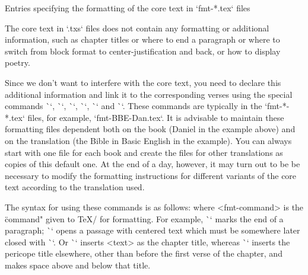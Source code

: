\secc[fmt] Entries specifying the formatting of the core text in `fmt-*.tex` files

The core text in `.txs` files does not contain any formatting or additional information, 
such as chapter titles or where to end a paragraph or where to switch from block format 
to center-justification   and back, or how to display poetry.


Since we don't want to interfere with the core text, 
you need to declare this additional information and link it to the corresponding verses using the special commands \`\fmtadd`, \`\fmtpre`, \`\fmtins`, \`\fmtfont`, \`\fmtkeep` and \`\fmtrepl`. 
These commands are typically in the `fmt-*-*.tex` files,
for example, `fmt-BBE-Dan.tex`. It is advisable to maintain these formatting files
dependent both on the book (Daniel in the example above) and on the translation (the Bible in Basic English in the example). 
You can always start with one file for each book and  create the files for  other translations as copies of this default one.  At the end of a day, 
however, it may turn out to be be necessary to modify the formatting instructions for different variants of the core text according to the translation used.


The syntax for using these commands is as follows:
\begtt
{}
\endtt
where <fmt-command> is the \"command" given to \TeX/ for formatting.
For example, \`\endgraf` marks the end of a paragraph; \`\begcenter` opens a passage with
centered text which must be somewhere later closed  with \`\endcenter`. Or 
\`` inserts <text> as the chapter title, whereas
\`` inserts the pericope title elsewhere, other than before the first verse of the chapter, and makes space above and below that title.

